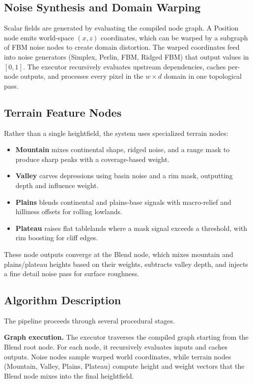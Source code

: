 \documentclass[12pt]{article}
\begin{document}
\subsection{Noise Synthesis and Domain Warping}

Scalar fields are generated by evaluating the compiled node graph. A Position node emits world-space $(x,z)$ coordinates, which can be warped by a subgraph of FBM noise nodes to create domain distortion. The warped coordinates feed into noise generators (Simplex, Perlin, FBM, Ridged FBM) that output values in $[0,1]$. The executor recursively evaluates upstream dependencies, caches per-node outputs, and processes every pixel in the $w \times d$ domain in one topological pass.



\subsection{Terrain Feature Nodes}

Rather than a single heightfield, the system uses specialized terrain nodes:
\begin{itemize}
    \item \textbf{Mountain} mixes continental shape, ridged noise, and a range mask to produce sharp peaks with a coverage-based weight.
    \item \textbf{Valley} carves depressions using basin noise and a rim mask, outputting depth and influence weight.
    \item \textbf{Plains} blends continental and plains-base signals with macro-relief and hilliness offsets for rolling lowlands.
    \item \textbf{Plateau} raises flat tablelands where a mask signal exceeds a threshold, with rim boosting for cliff edges.
\end{itemize}
These node outputs converge at the Blend node, which mixes mountain and plains/plateau heights based on their weights, subtracts valley depth, and injects a fine detail noise pass for surface roughness.

\subsection{Algorithm Description}

The pipeline proceeds through several procedural stages.

\textbf{Graph execution.} The executor traverses the compiled graph starting from the Blend root node. For each node, it recursively evaluates inputs and caches outputs. Noise nodes sample warped world coordinates, while terrain nodes (Mountain, Valley, Plains, Plateau) compute height and weight vectors that the Blend node mixes into the final heightfield.
\end{document}
